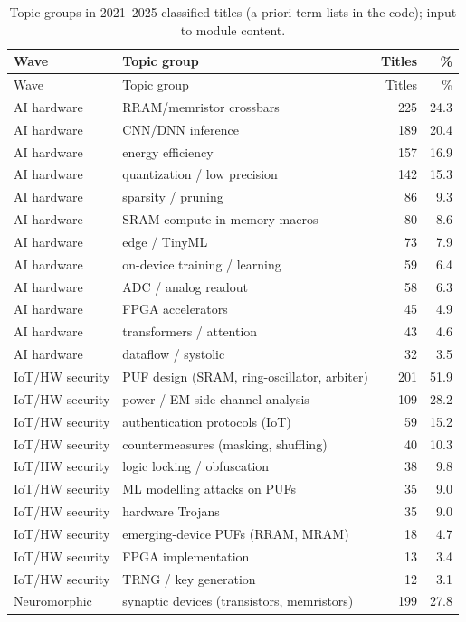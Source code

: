 \documentclass[10pt]{article}
\begin{document}
\begin{longtable}{@{}lL{8cm}rr@{}}
\caption{Topic groups in 2021--2025 classified titles (a-priori term lists in the code); input to module content.}\label{tab:S9}\\
\toprule
Wave & Topic group & Titles & \% \\
\midrule
\endfirsthead
\toprule
Wave & Topic group & Titles & \% \\
\midrule
\endhead
\bottomrule
\endlastfoot
AI hardware & RRAM/memristor crossbars & 225 & 24.3 \\
AI hardware & CNN/DNN inference & 189 & 20.4 \\
AI hardware & energy efficiency & 157 & 16.9 \\
AI hardware & quantization / low precision & 142 & 15.3 \\
AI hardware & sparsity / pruning & 86 & 9.3 \\
AI hardware & SRAM compute-in-memory macros & 80 & 8.6 \\
AI hardware & edge / TinyML & 73 & 7.9 \\
AI hardware & on-device training / learning & 59 & 6.4 \\
AI hardware & ADC / analog readout & 58 & 6.3 \\
AI hardware & FPGA accelerators & 45 & 4.9 \\
AI hardware & transformers / attention & 43 & 4.6 \\
AI hardware & dataflow / systolic & 32 & 3.5 \\
IoT/HW security & PUF design (SRAM, ring-oscillator, arbiter) & 201 & 51.9 \\
IoT/HW security & power / EM side-channel analysis & 109 & 28.2 \\
IoT/HW security & authentication protocols (IoT) & 59 & 15.2 \\
IoT/HW security & countermeasures (masking, shuffling) & 40 & 10.3 \\
IoT/HW security & logic locking / obfuscation & 38 & 9.8 \\
IoT/HW security & ML modelling attacks on PUFs & 35 & 9.0 \\
IoT/HW security & hardware Trojans & 35 & 9.0 \\
IoT/HW security & emerging-device PUFs (RRAM, MRAM) & 18 & 4.7 \\
IoT/HW security & FPGA implementation & 13 & 3.4 \\
IoT/HW security & TRNG / key generation & 12 & 3.1 \\
Neuromorphic & synaptic devices (transistors, memristors) & 199 & 27.8 \\

\end{longtable}
\end{document}
